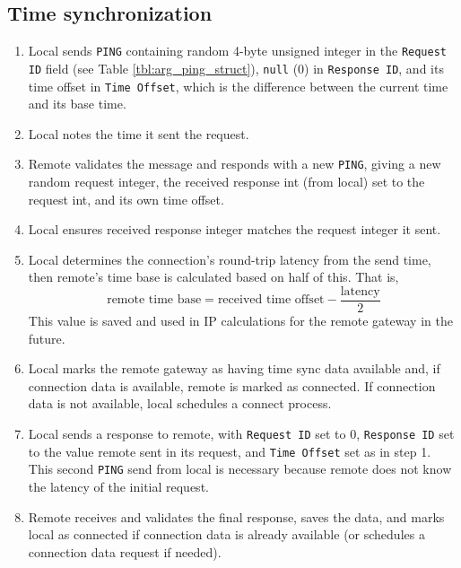 \subsection{Time synchronization}
\label{sec:arg_time_sync}
\begin{enumerate}
	\item Local sends \texttt{PING} containing random 4-byte unsigned integer in the \texttt{Request ID} field (see Table \ref{tbl:arg_ping_struct}), \texttt{null} (0) in \texttt{Response ID}, and its time offset in \texttt{Time Offset}, which is the difference between the current time and its base time. 
	\item Local notes the time it sent the request.
	\item Remote validates the message and responds with a new \texttt{PING}, giving a new random request integer, the received response int (from local) set to the request int, and its own time offset.
	\item Local ensures received response integer matches the request integer it sent.
	\item Local determines the connection's round-trip latency from the send time, then remote's time base is calculated based on half of this. That is,
	$$\text{remote time base} = \text{received time offset} - \frac{\text{latency}}{2}$$
	This value is saved and used in \ac{IP} calculations for the remote gateway in the future.

	\item Local marks the remote gateway as having time sync data available and, if connection data is available, remote is marked as connected. If connection data is not available, local schedules a connect process.
	\item Local sends a response to remote, with \texttt{Request ID} set to 0, \texttt{Response ID} set to the value remote sent in its request, and \texttt{Time Offset} set as in step 1. This second \texttt{PING} send from local is necessary because remote does not know the latency of the initial request.
	\item Remote receives and validates the final response, saves the data, and marks local as connected if connection data is already available (or schedules a connection data request if needed).
\end{enumerate}

